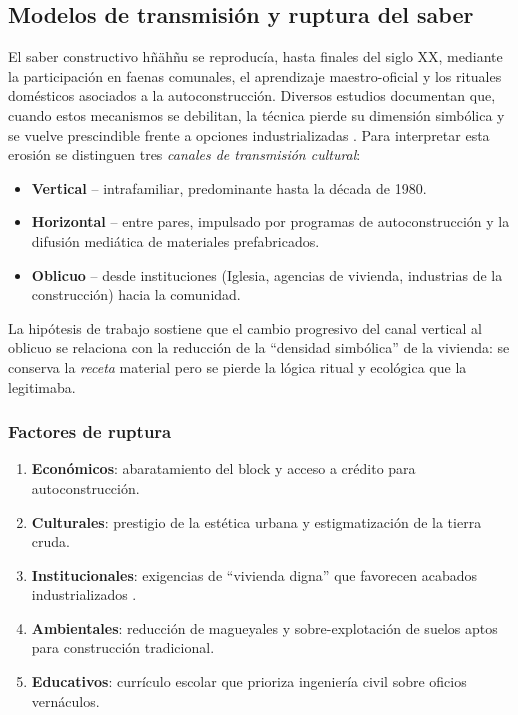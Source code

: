 \subsection{Modelos de transmisión y ruptura del saber}
\label{subsec:modelos_transmision}

El saber constructivo hñähñu se reproducía, hasta finales del siglo XX,
mediante la participación en faenas comunales, el aprendizaje
maestro-oficial y los rituales domésticos asociados a la
autoconstrucción.  Diversos estudios documentan que, cuando estos
mecanismos se debilitan, la técnica pierde su dimensión simbólica y se
vuelve prescindible frente a opciones industrializadas
\citep{torres2021transmision,gandara2000}.  Para interpretar esta
erosión se distinguen tres \emph{canales de transmisión cultural}:

\begin{itemize}
	\item \textbf{Vertical} – intrafamiliar, predominante hasta la década
	      de 1980.
	\item \textbf{Horizontal} – entre pares, impulsado por programas de
	      autoconstrucción y la difusión mediática de materiales
	      prefabricados.
	\item \textbf{Oblicuo} – desde instituciones (Iglesia, agencias de
	      vivienda, industrias de la construcción) hacia la comunidad.
\end{itemize}

La hipótesis de trabajo sostiene que el cambio progresivo del
canal vertical al oblicuo se relaciona con la reducción de la ``densidad
simbólica'' de la vivienda: se conserva la \emph{receta} material pero se
pierde la lógica ritual y ecológica que la legitimaba.

\subsubsection{Factores de ruptura}

\begin{enumerate}
	\item \textbf{Económicos}: abaratamiento del block y acceso a crédito
	      para autoconstrucción.
	\item \textbf{Culturales}: prestigio de la estética urbana y
	      estigmatización de la tierra cruda.
	\item \textbf{Institucionales}: exigencias de ``vivienda digna'' que
	      favorecen acabados industrializados \citep{herrejon2006patrimonio}.
	\item \textbf{Ambientales}: reducción de magueyales y sobre-explotación
	      de suelos aptos para construcción tradicional.
	\item \textbf{Educativos}: currículo escolar que prioriza ingeniería
	      civil sobre oficios vernáculos.
\end{enumerate}


